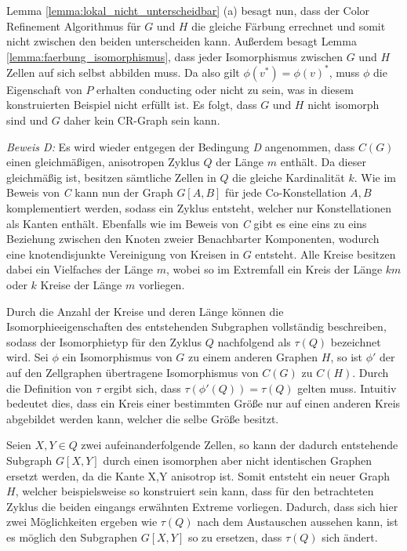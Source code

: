 Lemma \ref{lemma:lokal_nicht_unterscheidbar} (a) besagt nun, dass der Color Refinement Algorithmus für $G$ und $H$ die gleiche Färbung errechnet und somit nicht zwischen den beiden unterscheiden kann.
Außerdem besagt Lemma \ref{lemma:faerbung_isomorphismus}, dass jeder Isomorphismus zwischen $G$ und $H$ Zellen auf sich selbst abbilden muss.
Da also gilt $\phi (v^*)=\phi (v)^*$, muss $\phi $ die Eigenschaft von $P$ erhalten conducting oder nicht zu sein, was in diesem konstruierten Beispiel nicht erfüllt ist.
Es folgt, dass $G$ und $H$ nicht isomorph sind und $G$ daher kein CR-Graph sein kann.

\emph{Beweis D:} Es wird wieder entgegen der Bedingung \emph{D} angenommen, dass $C(G)$ einen gleichmäßigen, anisotropen Zyklus $Q$ der Länge $m$ enthält.
Da dieser gleichmäßig ist, besitzen sämtliche Zellen in $Q$ die gleiche Kardinalität $k$.
Wie im Beweis von \emph{C} kann nun der Graph $G[A,B]$ für jede Co-Konstellation ${A,B}$ komplementiert werden, sodass ein Zyklus entsteht, welcher nur Konstellationen als Kanten enthält.
Ebenfalls wie im Beweis von \emph{C} gibt es eine eins zu eins Beziehung zwischen den Knoten zweier Benachbarter Komponenten, wodurch eine knotendisjunkte Vereinigung von Kreisen in $G$ entsteht.
Alle Kreise besitzen dabei ein Vielfaches der Länge $m$, wobei so im Extremfall ein Kreis der Länge $km$ oder $k$ Kreise der Länge $m$ vorliegen.

Durch die Anzahl der Kreise und deren Länge können die Isomorphieeigenschaften des entstehenden Subgraphen vollständig beschreiben, sodass der Isomorphietyp für den Zyklus $Q$ nachfolgend als $\tau (Q)$ bezeichnet wird.
Sei $\phi $ ein Isomorphismus von $G$ zu einem anderen Graphen $H$, so ist $\phi '$ der auf den Zellgraphen übertragene Isomorphismus von $C(G)$ zu $C(H)$.
Durch die Definition von $\tau $ ergibt sich, dass $\tau (\phi '(Q))=\tau (Q)$ gelten muss.
Intuitiv bedeutet dies, dass ein Kreis einer bestimmten Größe nur auf einen anderen Kreis abgebildet werden kann, welcher die selbe Größe besitzt.

Seien $X,Y\in Q$ zwei aufeinanderfolgende Zellen, so kann der dadurch entstehende Subgraph $G[X,Y]$ durch einen isomorphen aber nicht identischen Graphen ersetzt werden, da die Kante {X,Y} anisotrop ist.
Somit entsteht ein neuer Graph $H$, welcher beispielsweise so konstruiert sein kann, dass für den betrachteten Zyklus die beiden eingangs erwähnten Extreme vorliegen.
Dadurch, dass sich hier zwei Möglichkeiten ergeben wie $\tau (Q)$ nach dem Austauschen aussehen kann, ist es möglich den Subgraphen $G[X,Y]$ so zu ersetzen, dass $\tau (Q)$ sich ändert.

